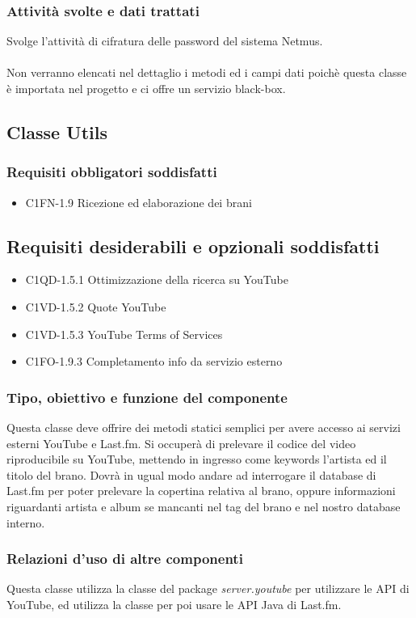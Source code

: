  \subsubsection*{Attivit\`a svolte e dati trattati}
Svolge l'attivit\`a di cifratura delle password del sistema Netmus.
\\\\
Non verranno elencati nel dettaglio i metodi ed i campi dati poich\`e questa
classe \`e importata nel progetto e ci offre un servizio black-box.

\subsection{Classe Utils}
\subsubsection*{Requisiti obbligatori soddisfatti}
\begin{itemize}
    \item C1FN-1.9 Ricezione ed elaborazione dei brani
\end{itemize}
\subsection*{Requisiti desiderabili e opzionali soddisfatti}
\begin{itemize}
    \item C1QD-1.5.1 Ottimizzazione della ricerca su YouTube
    \item C1VD-1.5.2 Quote YouTube
    \item C1VD-1.5.3 YouTube Terms of Services
    \item C1FO-1.9.3 Completamento info da servizio esterno
\end{itemize}
\subsubsection*{Tipo, obiettivo e funzione del componente}
Questa classe deve offrire dei metodi statici semplici per avere accesso ai
servizi esterni YouTube e Last.fm. Si occuper\`a di prelevare il codice
del video riproducibile su YouTube, mettendo in ingresso come keywords l'artista
ed il titolo del brano. Dovr\`a in ugual modo andare ad interrogare il database
di Last.fm per poter prelevare la copertina relativa al brano, oppure
informazioni riguardanti artista e album se mancanti nel tag del brano e nel
nostro database interno.
\subsubsection*{Relazioni d'uso di altre componenti}
Questa classe utilizza la classe  del package
\emph{server.youtube} per utilizzare le API di YouTube, ed utilizza la classe
 per poi usare le API Java di Last.fm.
